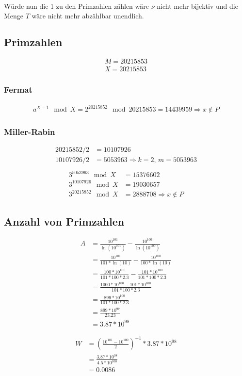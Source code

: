 \documentclass{article}
\begin{document}
Würde nun die 1 zu den Primzahlen zählen wäre $\nu$ nicht mehr bijektiv und die
Menge $T$ wäre nicht mehr abzählbar unendlich.

\subsection{Primzahlen}

\begin{align*}
	M = 20215853\\
	X = 20215853
\end{align*}

\subsubsection{Fermat}

\begin{align*}
	a^{X-1} \mod X = 2^{20215852} \mod 20215853 = 14439959 \Rightarrow x \notin P
\end{align*}

\subsubsection{Miller-Rabin}

\begin{align*}
	20215852 / 2 & = 10107926\\
	10107926 / 2 & = 5053963 \Rightarrow k = 2,\,m = 5053963\\
\end{align*}
\begin{align*}
	3^{5053963} \mod X & = 15376602\\
	3^{10107926} \mod X & = 19030657\\
	3^{20215852} \mod X & = 2888708 \Rightarrow x \notin P
\end{align*}

\subsection{Anzahl von Primzahlen}

\begin{align*}
	A & = \frac{10^{101}}{\ln(10^{101})} - \frac{10^{100}}{\ln(10^{100})}\\
	  & = \frac{10^{101}}{101*\ln(10)} - \frac{10^{100}}{100*\ln(10)}\\
	  & = \frac{100*10^{101}}{101*100*2.3} - \frac{101*10^{100}}{101*100*2.3}\\
	  & = \frac{1000*10^{100} - 101*10^{100}}{101*100*2.3}\\
	  & = \frac{899*10^{100}}{101*100*2.3}\\
	  & = \frac{899*10^{97}}{23.23}\\
	  & = 3.87*10^{98}
\end{align*}


\begin{align*}
	W & = {(\frac{10^{101} - 10^{100}}{2})}^{-1} * 3.87*10^{98}\\
	  & = \frac{3.87*10^{98}}{4.5*10^{100}}\\
	  & = 0.0086
\end{align*}
\end{document}
